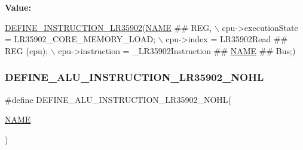 {\bfseries Value\+:}
\begin{DoxyCode}
\mbox{\hyperlink{isa-lr35902_8c_a3128fc43c5d01e8b51f67901c0b4b5ef}{DEFINE\_INSTRUCTION\_LR35902}}(\mbox{\hyperlink{inflate_8h_a164ea0159d5f0b5f12a646f25f99eceaa67bc2ced260a8e43805d2480a785d312}{NAME}} ## REG, \(\backslash\)
        cpu->executionState = LR35902\_CORE\_MEMORY\_LOAD; \(\backslash\)
        cpu->index = LR35902Read ## REG (cpu); \(\backslash\)
        cpu->instruction = \_LR35902Instruction ## \mbox{\hyperlink{inflate_8h_a164ea0159d5f0b5f12a646f25f99eceaa67bc2ced260a8e43805d2480a785d312}{NAME}} ## Bus;)
\end{DoxyCode}
\mbox{\label{isa-lr35902_8c_acf6eeee6f2a9b23cf52be54e33db8ad9}} 
\subsubsection{\texorpdfstring{D\+E\+F\+I\+N\+E\+\_\+\+A\+L\+U\+\_\+\+I\+N\+S\+T\+R\+U\+C\+T\+I\+O\+N\+\_\+\+L\+R35902\+\_\+\+N\+O\+HL}{DEFINE\_ALU\_INSTRUCTION\_LR35902\_NOHL}}
{\footnotesize\ttfamily \#define D\+E\+F\+I\+N\+E\+\_\+\+A\+L\+U\+\_\+\+I\+N\+S\+T\+R\+U\+C\+T\+I\+O\+N\+\_\+\+L\+R35902\+\_\+\+N\+O\+HL(\begin{DoxyParamCaption}\item[{}]{\mbox{\hyperlink{inflate_8h_a164ea0159d5f0b5f12a646f25f99eceaa67bc2ced260a8e43805d2480a785d312}{N\+A\+ME}} }\end{DoxyParamCaption})}


